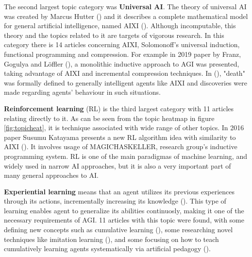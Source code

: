The second largest topic category was \textbf{Universal AI}. The theory of
universal AI was created by Marcus Hutter (\cite*{hutter2004}) and it describes
a complete mathematical model for general artificial intelligence, named AIXI
(\cite{hutter2012decade}). Although incomputable, this theory and the topics
related to it are targets of vigorous research. In this category there is 14
articles concerning AIXI, Solomonoff's universal induction, functional
programming and compression. For example in 2019 paper by Franz, Gogulya and
Löffler (\cite*{franz2019william}), a monolithic inductive approach to AGI was
presented, taking advantage of AIXI and incremental compression techniques. In
(\cite{martin2016death}), "death" was formally defined to generally intelligent
agents like AIXI and discoveries were made regarding agents' behaviour in such
situations.

\textbf{Reinforcement learning} (RL) is the third largest category with 11
articles relating directly to it. As can be seen from the topic heatmap in
figure \ref{fig:topicheat}, it is technique associated with wide range of other
topics. In 2016 paper Susumu Katayama presents a new RL algorithm idea with
similarity to AIXI (\cite{katayama2016ideas}). It involves usage of
MAGICHASKELLER, research group's inductive programming system. RL is one of the
main paradigmas of machine learning, and widely used in narrow AI approaches,
but it is also a very important part of many general approaches to AI.

\textbf{Experiential learning} means that an agent utilizes its previous
experiences through its actions, incrementally increasing its knowledge
(\cite{thorisson2019cumulative}). This type of learning enables agent to
generalize its abilities continuosly, making it one of the necessary
requirements of AGI. 11 articles with this topic were found, with some defining
new concepts such as cumulative learning (\cite{thorisson2019cumulative}), some
researching novel techniques like imitation learning (\cite{katz2016imitation}),
and some focusing on how to teach cumulatively learning agents systematically
via artificial pedagogy (\cite{bieger2017pentagon}).


